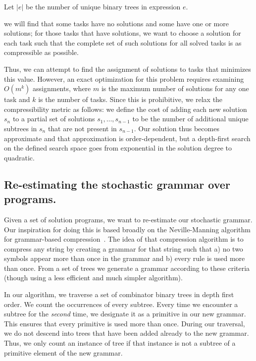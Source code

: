 \documentclass{article}
\begin{document}
Let $|e|$ be the
number of unique binary trees in expression $e$. 

we will find that some tasks have no solutions
and some have one or more solutions; for those tasks that have
solutions, we want to choose a solution for each task such that the
complete set of such solutions for all solved tasks is as compressible
as possible.


Thus, we can attempt
to find the assignment of solutions to tasks that minimizes this
value. However, an exact optimization for this problem requires
examining $O(m^k)$ assignments, where $m$ is the maximum number of
solutions for any one task and $k$ is the number of tasks. Since this
is prohibitive, we relax the compressibility metric as follows: we
define the cost of adding each new solution $s_n$ to a partial set of
solutions $s_1, \dots, s_{n-1}$ to be the number of additional unique
subtrees in $s_n$ that are not present in $s_{n-1}$. Our solution thus
becomes approximate and that approximation is order-dependent, but a
depth-first search on the defined search space goes from exponential
in the solution degree to quadratic.

\subsection{Re-estimating the stochastic grammar over programs.}

Given a set of solution programs, we want to re-estimate our
stochastic grammar. Our inspiration for doing this is based broadly on
the Neville-Manning algorithm for grammar-based
compression~\cite{nevill1997identifying}. The idea of that compression
algorithm is to compress any string by creating a grammar for that
string such that a) no two symbols appear more than once in the
grammar and b) every rule is used more than once. From a set of trees
we generate a grammar according to these criteria (though using a less
efficient and much simpler algorithm). 

In our algorithm, we traverse a set of combinator binary trees in
depth first order. We count the occurrences of every subtree. Every
time we encounter a subtree for the \emph{second} time, we designate
it as a primitive in our new grammar. This ensures that every
primitive is used more than once. During our traversal, we do not
descend into trees that have been added already to the new
grammar. Thus, we only count an instance of tree if that instance is
not a subtree of a primitive element of the new grammar.
\end{document}
